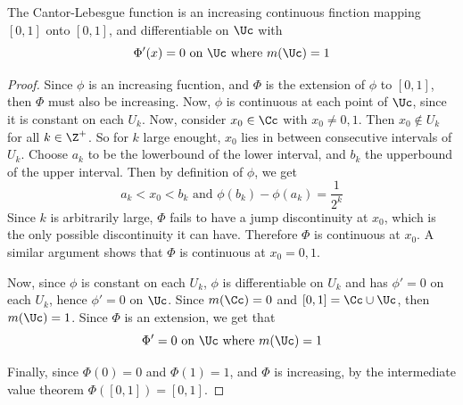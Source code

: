 \begin{theorem}\label{8.7.2}
    The Cantor-Lebesgue function is an increasing continuous finction mapping
    $[0,1]$ onto $[0,1]$, and differentiable on $\Uc$ with
    \begin{equation*}
        \Phi'(x)=0 \text{ on } \Uc \text{ where } m(\Uc)=1
    \end{equation*}
\end{theorem}
\begin{proof}
    Since $\phi$ is an increasing fucntion, and  $\Phi$ is the extension of
    $\phi$ to  $[0,1]$, then $\Phi$ must also be increasing. Now,  $\phi$ is
    continuous at each point of  $\Uc$, since it is constant on each  $U_k$.
    Now, consider  $x_0 \in \Cc$ with $x_0 \neq 0,1$. Then $x_0 \notin U_k$ for
    all $k \in \Z^+$. So for  $k$ large enought,  $x_0$ lies in between
    consecutive intervals of $U_k$. Choose  $a_k$ to be the lowerbound of the
    lower interval, and  $b_k$ the upperbound of the upper interval. Then by
    definition of  $\phi$, we get
    \begin{equation*}
        a_k<x_0<b_k \text{ and } \phi(b_k)-\phi(a_k)=\frac{1}{2^k}
    \end{equation*}
    Since $k$ is arbitrarily large, $\Phi$ fails to have a jump discontinuity at
     $x_0$, which is the only possible discontinuity it can have. Therefore
     $\Phi$ is continuous at  $x_0$. A similar argument shows that $\Phi$ is
     continuous at $x_0=0,1$.

     Now, since $\phi$ is constant on each  $U_k$,  $\phi$ is differentiable on
      $U_k$ and has  $\phi'=0$ on each  $U_k$, hence  $\phi'=0$ on $\Uc$. Since
      $m(\Cc)=0$ and $[0,1]=\Cc \cup \Uc$, then $m(\Uc)=1$. Since $\Phi$ is an
      extension, we get that
      \begin{equation*}
          \Phi'=0 \text{ on } \Uc \text{ where } m(\Uc)=1
      \end{equation*}

      Finally, since $\Phi(0)=0$ and $\Phi(1)=1$, and $\Phi$ is increasing, by
      the intermediate value theorem $\Phi([0,1])=[0,1]$.
\end{proof}

